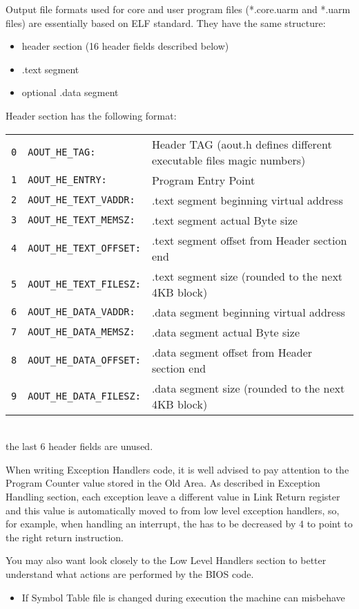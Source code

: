 
Output file formats used for core and user program files (*.core.uarm and *.uarm files) are essentially based on ELF standard. They have the same structure:
\begin{itemize}
\item header section (16 header fields described below)
\item .text segment
\item optional .data segment
\end{itemize}

Header section has the following format:
\\

\noindent
\begin{tabular}{rlp{8cm}}
\texttt{0} & \texttt{AOUT\_HE\_TAG:} & Header TAG (aout.h defines different executable files magic numbers) \\
\texttt{1} & \texttt{AOUT\_HE\_ENTRY:} & Program Entry Point \\
\texttt{2} & \texttt{AOUT\_HE\_TEXT\_VADDR:} & .text segment beginning virtual address \\
\texttt{3} & \texttt{AOUT\_HE\_TEXT\_MEMSZ:} & .text segment actual Byte size \\
\texttt{4} & \texttt{AOUT\_HE\_TEXT\_OFFSET:} & .text segment offset from Header section end \\
\texttt{5} & \texttt{AOUT\_HE\_TEXT\_FILESZ:} & .text segment size (rounded to the next 4KB block) \\
\texttt{6} & \texttt{AOUT\_HE\_DATA\_VADDR:} & .data segment beginning virtual address \\
\texttt{7} & \texttt{AOUT\_HE\_DATA\_MEMSZ:} & .data segment actual Byte size \\
\texttt{8} & \texttt{AOUT\_HE\_DATA\_OFFSET:} & .data segment offset from Header section end \\
\texttt{9} & \texttt{AOUT\_HE\_DATA\_FILESZ:} & .data segment size (rounded to the next 4KB block) \\
\end{tabular}
\\

the last 6 header fields are unused.


When writing Exception Handlers code, it is well advised to pay attention to the Program Counter value stored in the Old Area. As described in Exception Handling section, each exception leave a different value in Link Return register and this value is automatically moved to  from low level exception handlers, so, for example, when handling an interrupt, the  has to be decreased by 4 to point to the right return instruction.

You may also want look closely to the Low Level Handlers section to better understand what actions are performed by the BIOS code.


\begin{itemize}
\item If Symbol Table file is changed during execution the machine can misbehave
\end{itemize}
